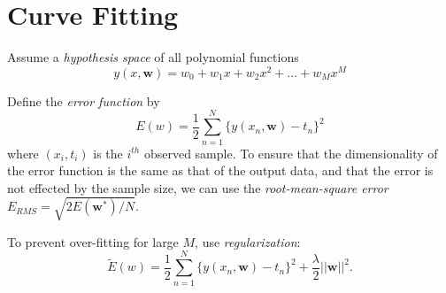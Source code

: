 \documentclass[11pt]{article}
\begin{document}
\section{Curve Fitting}
Assume a \textit{hypothesis space} of all polynomial functions
\begin{equation*}
  y(x, \textbf{w}) = w_0 + w_1 x + w_2 x^2 + ... + w_M x^M
\end{equation*}

Define the \textit{error function} by
\begin{equation*}
  E(w) = \frac{1}{2} \sum_{n=1}^N \{ y(x_n, \textbf{w}) - t_n\}^2
\end{equation*}
where $(x_i, t_i)$ is the $i^{th}$ observed sample. To ensure that the
dimensionality of the error function is the same as that of the output data,
and that the error is not effected by the sample size, we can use the
\textit{root-mean-square error} $E_{RMS} = \sqrt{2E(\textbf{w}^*)/N}$.

To prevent over-fitting for large $M$, use \textit{regularization}:
\begin{equation*}
  \tilde{E}(w) = \frac{1}{2} \sum_{n=1}^N \{ y(x_n, \textbf{w}) - t_n\}^2
  + \frac{\lambda}{2} ||\textbf{w}||^2.
\end{equation*}
\end{document}
